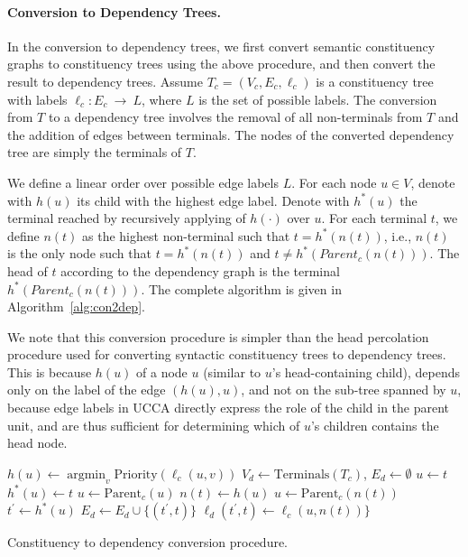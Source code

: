 \documentclass[11pt]{article}
\DeclareMathOperator*{\argmin}{argmin}
\begin{document}
\paragraph{Conversion to Dependency Trees.}\label{subsec:con2dep}
In the conversion to dependency trees, we first convert semantic constituency graphs
to constituency trees using the above procedure, and then convert the result to dependency trees. 
Assume $T_c=(V_c,E_c,\ell_c)$ is a constituency tree with labels $\ell_c:E_c~\rightarrow~L$,
where $L$ is the set of possible labels.
The conversion from $T$ to a dependency tree involves the removal of
all non-terminals from $T$ and the addition of edges between terminals.
The nodes of the converted dependency tree are simply the terminals of $T$.

We define a linear order over possible edge labels $L$.
For each node $u \in V$, denote with $h(u)$ its child with the highest edge label.
Denote with $h^*(u)$ the terminal reached by recursively applying of $h(\cdot)$ over $u$.
For each terminal $t$, we define $n(t)$ as the highest
non-terminal such that $t=h^*(n(t))$, i.e.,
$n(t)$ is the only node such that $t=h^*(n(t))$ and $t \neq h^*(Parent_c(n(t)))$.
The head of $t$ according to the dependency graph is
the terminal $h^*(Parent_c(n(t)))$.
The complete algorithm is given in Algorithm~\ref{alg:con2dep}.

We note that this conversion procedure is simpler than the
head percolation procedure used for converting syntactic constituency
trees to dependency trees.
This is because $h(u)$ of a node $u$ (similar to $u$'s head-containing child),
depends only on the label of the edge $(h(u),u)$, and not on the sub-tree spanned by $u$,
because edge labels in UCCA directly express the role of the child in the parent unit, and
are thus sufficient for determining which of $u$'s children contains the head node.


\begin{algorithm}[t]
  {
  $h(u) \leftarrow \argmin_v \mathrm{Priority}(\ell_c(u,v))$\;
 }
 $V_d \leftarrow \mathrm{Terminals}({T_c})$,
 $E_d \leftarrow \emptyset$\;
  {
  $u \leftarrow t$\;
   {
  	$h^*(u) \leftarrow t$\;
  	$u \leftarrow \mathrm{Parent}_c(u)$\;
  }
  $n(t) \leftarrow h(u)$\;
 }
  {
  $u \leftarrow \mathrm{Parent}_c(n(t))$\;
  $t^\prime \leftarrow h^*(u)$\;
  $E_d \leftarrow E_d \cup \{(t^\prime, t)\}$\;
  $\ell_d (t^\prime, t) \leftarrow \ell_c(u, n(t))\}$\;
 }
 \caption{Constituency to dependency conversion procedure.}
 \label{alg:con2dep}
\end{algorithm}
\end{document}

